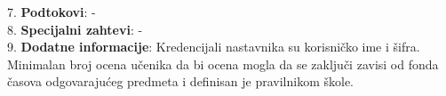 \documentclass{article}
\begin{document}
7. \textbf{Podtokovi}: - \\

8. \textbf{Specijalni zahtevi}: - \\

9. \textbf{Dodatne informacije}: Kredencijali nastavnika su korisničko ime i šifra. Minimalan broj ocena učenika da bi ocena mogla da se zaključi zavisi od fonda časova odgovarajućeg predmeta i definisan je pravilnikom škole.  \\
\end{document}

